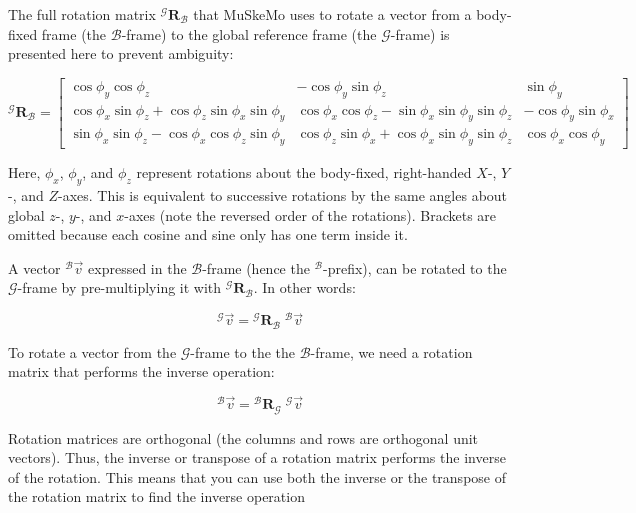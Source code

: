 \documentclass{article}
\begin{document}
The full rotation matrix ${}^{\mathcal{G}} \mathbf{R}_{\mathcal{B}}$ that MuSkeMo uses to rotate a vector from a body-fixed frame (the ${\mathcal{B}}$-frame) to the global reference frame (the ${\mathcal{G}}$-frame) is presented here to prevent ambiguity:


\begin{equation}
    {}^{\mathcal{G}} \mathbf{R}_{\mathcal{B}} =
    \begin{bmatrix}
    \cos \phi_y \cos \phi_z & -\cos \phi_y \sin \phi_z & \sin \phi_y \\
    \cos \phi_x \sin \phi_z + \cos \phi_z \sin \phi_x \sin \phi_y & \cos \phi_x \cos \phi_z - \sin \phi_x \sin \phi_y \sin \phi_z & -\cos \phi_y \sin \phi_x \\
    \sin \phi_x \sin \phi_z - \cos \phi_x \cos \phi_z \sin \phi_y & \cos \phi_z \sin \phi_x + \cos \phi_x \sin \phi_y \sin \phi_z & \cos \phi_x \cos \phi_y
    \end{bmatrix}
    \label{eq:grbmatrix}
\end{equation}


Here, \( \phi_x \), \( \phi_y \), and \( \phi_z \) represent rotations about the body-fixed, right-handed \( X \)-, \( Y \)-, and \( Z \)-axes. This is equivalent to successive rotations by the same angles about global \( z \)-, \( y \)-, and \( x \)-axes (note the reversed order of the rotations). Brackets are omitted because each cosine and sine only has one term inside it.

A vector \( {}^{\mathcal{B}}\vec{v} \) expressed in the \( \mathcal{B} \)-frame (hence the \( {}^\mathcal{B} \)-prefix), can be rotated to the \( \mathcal{G} \)-frame by pre-multiplying it with \( {}^{\mathcal{G}} \mathbf{R}_{\mathcal{B}} \). In other words:

\begin{equation}
{}^{\mathcal{G}}\vec{v} = {}^{\mathcal{G}} \mathbf{R}_{\mathcal{B}} \; { }^{\mathcal{B}}\vec{v}
\end{equation}



To rotate a vector from the \( \mathcal{G} \)-frame to the the \( \mathcal{B} \)-frame, we need a rotation matrix that performs the inverse operation:

\begin{equation}
    {}^{\mathcal{B}}\vec{v} = {}^{\mathcal{B}} \mathbf{R}_{\mathcal{G}} \; { }^{\mathcal{G}}\vec{v}
\end{equation}

Rotation matrices are orthogonal (the columns and rows are orthogonal unit vectors). Thus, the inverse or transpose of a rotation matrix performs the inverse of the rotation. This means that you can use both the inverse or the transpose of the rotation matrix to find the inverse operation
\end{document}
